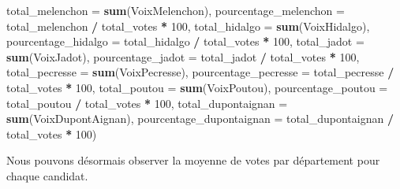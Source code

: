\documentclass[
]{article}
\newenvironment{Shaded}{\begin{snugshade}}{\end{snugshade}}
\newcommand{\AttributeTok}[1]{\textcolor[rgb]{0.13,0.29,0.53}{#1}}
\newcommand{\DecValTok}[1]{\textcolor[rgb]{0.00,0.00,0.81}{#1}}
\newcommand{\FunctionTok}[1]{\textcolor[rgb]{0.13,0.29,0.53}{\textbf{#1}}}
\newcommand{\NormalTok}[1]{#1}
\newcommand{\SpecialCharTok}[1]{\textcolor[rgb]{0.81,0.36,0.00}{\textbf{#1}}}
\begin{document}
\begin{Shaded}
\begin{Highlighting}[]
            \AttributeTok{total\_melenchon =} \FunctionTok{sum}\NormalTok{(VoixMelenchon),}
            \AttributeTok{pourcentage\_melenchon =}\NormalTok{ total\_melenchon }\SpecialCharTok{/}\NormalTok{ total\_votes }\SpecialCharTok{*} \DecValTok{100}\NormalTok{,}
            \AttributeTok{total\_hidalgo =} \FunctionTok{sum}\NormalTok{(VoixHidalgo),}
            \AttributeTok{pourcentage\_hidalgo =}\NormalTok{ total\_hidalgo }\SpecialCharTok{/}\NormalTok{ total\_votes }\SpecialCharTok{*} \DecValTok{100}\NormalTok{,}
            \AttributeTok{total\_jadot =} \FunctionTok{sum}\NormalTok{(VoixJadot),}
            \AttributeTok{pourcentage\_jadot =}\NormalTok{ total\_jadot }\SpecialCharTok{/}\NormalTok{ total\_votes }\SpecialCharTok{*} \DecValTok{100}\NormalTok{,}
            \AttributeTok{total\_pecresse =} \FunctionTok{sum}\NormalTok{(VoixPecresse),}
            \AttributeTok{pourcentage\_pecresse =}\NormalTok{ total\_pecresse }\SpecialCharTok{/}\NormalTok{ total\_votes }\SpecialCharTok{*} \DecValTok{100}\NormalTok{,}
            \AttributeTok{total\_poutou =} \FunctionTok{sum}\NormalTok{(VoixPoutou),}
            \AttributeTok{pourcentage\_poutou =}\NormalTok{ total\_poutou }\SpecialCharTok{/}\NormalTok{ total\_votes }\SpecialCharTok{*} \DecValTok{100}\NormalTok{,}
            \AttributeTok{total\_dupontaignan =} \FunctionTok{sum}\NormalTok{(VoixDupontAignan),}
            \AttributeTok{pourcentage\_dupontaignan =}\NormalTok{ total\_dupontaignan }\SpecialCharTok{/}\NormalTok{ total\_votes }\SpecialCharTok{*} \DecValTok{100}\NormalTok{)}
\end{Highlighting}
\end{Shaded}

Nous pouvons désormais observer la moyenne de votes par département pour
chaque candidat.
\end{document}
